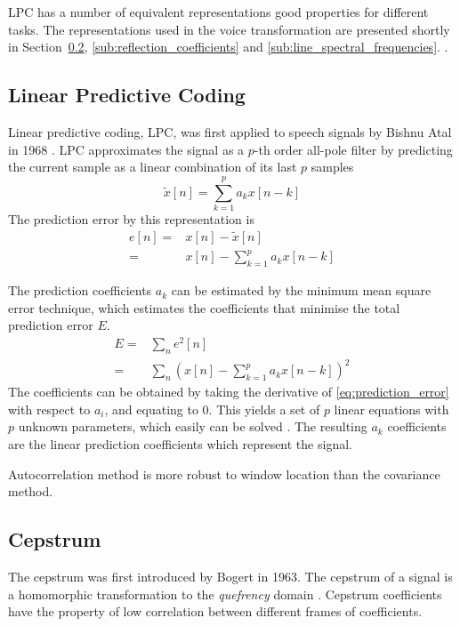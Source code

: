 LPC has a number of equivalent representations good properties for different tasks. The representations used in the voice transformation are presented shortly in Section~\ref{sub:cepstrum}, \ref{sub:reflection_coefficients} and \ref{sub:line_spectral_frequencies}.
.

\subsection{Linear Predictive Coding} %
\label{sub:lpc}
Linear predictive coding, LPC, was first applied to speech signals by Bishnu Atal \etal in 1968 \cite{atal68}. LPC approximates the signal as a $p$-th order all-pole filter by predicting the current sample as a linear combination of its last $p$ samples \cite{digsig}
\begin{equation}
	\tilde{x}[n] = \sum_{k=1}^{p}a_k x[n-k]
\end{equation}
The prediction error by this representation is 
\begin{equation}
	\begin{split}
		e[n]= & x[n]-\tilde{x}[n]\\
		= & x[n]-\sum_{k=1}^{p}a_k x[n-k]
	\end{split}
\end{equation}

The prediction coefficients $a_k$ can be estimated by the minimum mean square error technique, which estimates the coefficients that minimise the total prediction error $E$.
\begin{equation}
	\label{eq:prediction_error}
	\begin{split}
		E = & \sum_{n}e^2[n]\\
		= & \sum_{n}\left( x[n]-\sum_{k=1}^{p}a_k x[n-k] \right)^2
	\end{split}
\end{equation}
The coefficients can be obtained by taking the derivative of \eqref{eq:prediction_error} with respect to $a_i$, and equating to 0. This yields a set of $p$ linear equations with $p$ unknown parameters, which easily can be solved \cite{digsig}. The resulting $a_k$ coefficients are the linear prediction coefficients which represent the signal.

Autocorrelation method is more robust to window location than the covariance method.

\subsection{Cepstrum} %
\label{sub:cepstrum}
The cepstrum was first introduced by Bogert \etal \cite{bogert63} in 1963. The cepstrum of a signal is a homomorphic transformation to the \emph{quefrency} domain \cite{taletek}. Cepstrum coefficients have the property of low correlation between different frames of coefficients.


